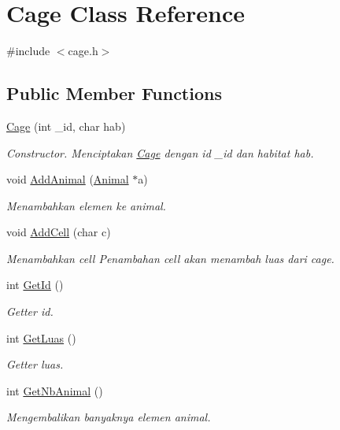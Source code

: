 \hypertarget{classCage}{}\section{Cage Class Reference}
\label{classCage}


{\ttfamily \#include $<$cage.\+h$>$}

\subsection*{Public Member Functions}
\begin{DoxyCompactItemize}
\item 
\hyperlink{classCage_ad281dd303f3e6f810a89d51af1c91443}{Cage} (int \+\_\+id, char hab)
\begin{DoxyCompactList}\small\item\em Constructor. Menciptakan \hyperlink{classCage}{Cage} dengan id \+\_\+id dan habitat hab. \end{DoxyCompactList}\item 
void \hyperlink{classCage_ad9f2bbc36b168b9a1eed1f575206e37a}{Add\+Animal} (\hyperlink{classAnimal}{Animal} $\ast$a)
\begin{DoxyCompactList}\small\item\em Menambahkan elemen ke animal. \end{DoxyCompactList}\item 
void \hyperlink{classCage_a814423376e6a50f31d33fea857fef9d5}{Add\+Cell} (char c)
\begin{DoxyCompactList}\small\item\em Menambahkan cell Penambahan cell akan menambah luas dari cage. \end{DoxyCompactList}\item 
int \hyperlink{classCage_a105581dec308e734a7527d420d7cb4ee}{Get\+Id} ()
\begin{DoxyCompactList}\small\item\em Getter id. \end{DoxyCompactList}\item 
int \hyperlink{classCage_a10136c36884c5c58f6c244afbeee120f}{Get\+Luas} ()
\begin{DoxyCompactList}\small\item\em Getter luas. \end{DoxyCompactList}\item 
int \hyperlink{classCage_a7d94436b894f2e5496ee467743bd2bcc}{Get\+Nb\+Animal} ()
\begin{DoxyCompactList}\small\item\em Mengembalikan banyaknya elemen animal. \end{DoxyCompactList}\item 

\end{DoxyCompactItemize}
